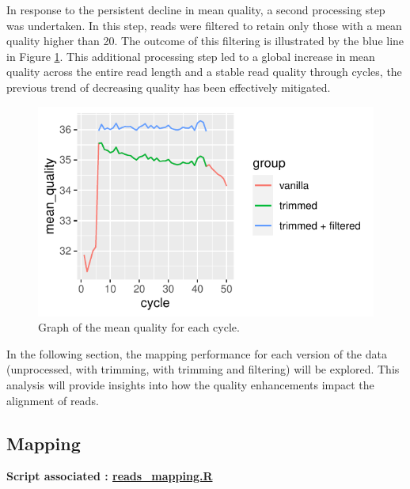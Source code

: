\documentclass[a4paper, 11pt]{article}
\begin{document}
\begin{multicols}{2}
In response to the persistent decline in mean quality, a second processing step was undertaken. In this step, reads were filtered to retain only those with a mean quality higher than 20. The outcome of this filtering is illustrated by the blue line in Figure \ref{fig:cycles_mean}. This additional processing step led to a global increase in mean quality across the entire read length and a stable read quality through cycles, the previous trend of decreasing quality has been effectively mitigated.


\begin{figure}[H]
    \centering
    \includegraphics[width=1\columnwidth]{Figures/QC_plots/mean_per_group_and_cycles.pdf}
    \caption{\small{ Graph of the mean quality for each cycle.}}
    \label{fig:cycles_mean}
\end{figure}

In the following section, the mapping performance for each version of the data (unprocessed, with trimming, with trimming and filtering) will be explored. This analysis will provide insights into how the quality enhancements impact the alignment of reads.

\subsection{Mapping}
\begin{scriptsize}
	\textbf{Script associated : \href{https://github.com/leopoldguyot/BINF-402_Transcriptomic_Project/blob/main/reads_mapping.R}{reads\_mapping.R}} 
\end{scriptsize}


\end{multicols}
\end{document}
